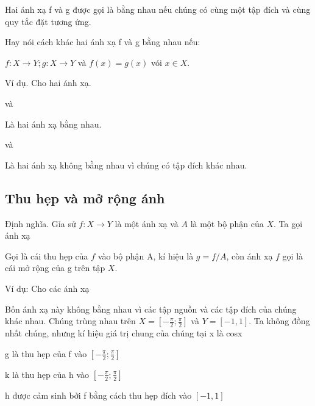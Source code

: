 \documentclass[12pt,oneside,a4paper,reqno]{book}
\begin{document}
    Hai ánh xạ f và g được gọi là bằng nhau nếu chúng có cùng một tập đích và cùng quy tắc đặt tương ứng.
    
    Hay nói cách khác hai ánh xạ f và g bằng nhau nếu:
    
        $f:X\to Y ;  g:X\to Y$ và $f(x)=g(x)$ vói $x\in X$.
        
Ví dụ. Cho hai ánh xạ.

 và 

Là hai ánh xạ bằng nhau.

 và \fullfunction{g}{\mathbb{R}}{[0;+\infty)}{x}{x^2}

Là hai ánh xạ không bằng nhau vì chúng có tập đích khác nhau.

\subsection{Thu hẹp và mở rộng ánh}
 Định nghĩa.
Gỉa sử $f:X\to Y$ là một ánh xạ và $A$ là một bộ phận của $X$. Ta gọi ánh xạ

\centerline{}

Gọi là cái thu hẹp của $f$ vào bộ phận  A, kí hiệu là $g=f/A$, còn ánh xạ $f$  gọi là cái mở rộng của g trên tập $X$.

Ví dụ: Cho các ánh xạ


        


Bốn ánh xạ này không bằng nhau vì các tập nguồn và các tập đích của chúng khác nhau. Chúng trùng nhau trên $X=\left[-\frac{\pi}{2};\frac{\pi}{2} \right ]$ và $Y=[-1,1]$. Ta không đồng nhất chúng,  nhưng kí hiệu giá trị chung của chúng tại x là cosx

         g là thu hẹp của f vào $\left[-\frac{\pi}{2};\frac{\pi}{2} \right ]$
         
         k là thu hẹp của h vào $\left[-\frac{\pi}{2};\frac{\pi}{2} \right ]$
         
         h được cảm sinh bởi f bằng cách thu hẹp đích vào $[-1,1]$
         
\end{document}
